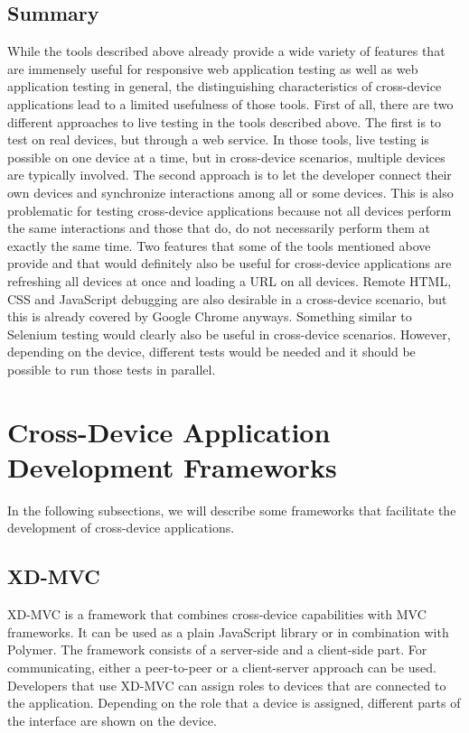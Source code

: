 \subsection{Summary}

While the tools described above already provide a wide variety of features that are immensely useful for responsive web application testing as well as web application testing in general, the distinguishing characteristics of cross-device applications lead to a limited usefulness of those tools. First of all, there are two different approaches to live testing in the tools described above. The first is to test on real devices, but through a web service. In those tools, live testing is possible on one device at a time, but in cross-device scenarios, multiple devices are typically involved. The second approach is to let the developer connect their own devices and synchronize interactions among all or some devices. This is also problematic for testing cross-device applications because not all devices perform the same interactions and those that do, do not necessarily perform them at exactly the same time. Two features that some of the tools mentioned above provide and that would definitely also be useful for cross-device applications are refreshing all devices at once and loading a URL on all devices. Remote HTML, CSS and JavaScript debugging are also desirable in a cross-device scenario, but this is already covered by Google Chrome anyways. Something similar to Selenium testing would clearly also be useful in cross-device scenarios. However, depending on the device, different tests would be needed and it should be possible to run those tests in parallel.

\section{Cross-Device Application Development Frameworks}

In the following subsections, we will describe some frameworks that facilitate the development of cross-device applications.

\subsection{XD-MVC}

XD-MVC is a framework that combines cross-device capabilities with MVC frameworks. It can be used as a plain JavaScript library or in combination with Polymer. The framework consists of a server-side and a client-side part. For communicating, either a peer-to-peer or a client-server approach can be used. Developers that use XD-MVC can assign roles to devices that are connected to the application. Depending on the role that a device is assigned, different parts of the interface are shown on the device. 

